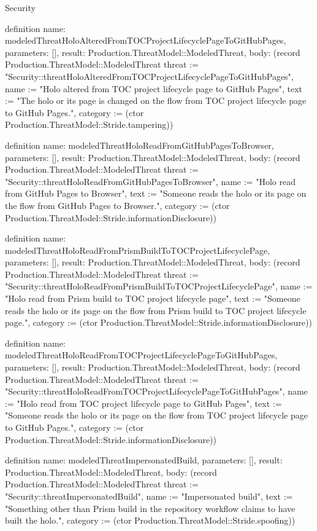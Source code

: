 \begin{lexlean}{Security}
\begin{semanticmodule}
definition{
  name: modeledThreatHoloAlteredFromTOCProjectLifecyclePageToGitHubPages,
  parameters: [],
  result: Production.ThreatModel::ModeledThreat,
  body: (record Production.ThreatModel::ModeledThreat {threat := "Security::threatHoloAlteredFromTOCProjectLifecyclePageToGitHubPages", name := "Holo altered from TOC project lifecycle page to GitHub Pages", text := "The holo or its page is changed on the flow from TOC project lifecycle page to GitHub Pages.", category := (ctor Production.ThreatModel::Stride.tampering)})
}

definition{
  name: modeledThreatHoloReadFromGitHubPagesToBrowser,
  parameters: [],
  result: Production.ThreatModel::ModeledThreat,
  body: (record Production.ThreatModel::ModeledThreat {threat := "Security::threatHoloReadFromGitHubPagesToBrowser", name := "Holo read from GitHub Pages to Browser", text := "Someone reads the holo or its page on the flow from GitHub Pages to Browser.", category := (ctor Production.ThreatModel::Stride.informationDisclosure)})
}

definition{
  name: modeledThreatHoloReadFromPrismBuildToTOCProjectLifecyclePage,
  parameters: [],
  result: Production.ThreatModel::ModeledThreat,
  body: (record Production.ThreatModel::ModeledThreat {threat := "Security::threatHoloReadFromPrismBuildToTOCProjectLifecyclePage", name := "Holo read from Prism build to TOC project lifecycle page", text := "Someone reads the holo or its page on the flow from Prism build to TOC project lifecycle page.", category := (ctor Production.ThreatModel::Stride.informationDisclosure)})
}

definition{
  name: modeledThreatHoloReadFromTOCProjectLifecyclePageToGitHubPages,
  parameters: [],
  result: Production.ThreatModel::ModeledThreat,
  body: (record Production.ThreatModel::ModeledThreat {threat := "Security::threatHoloReadFromTOCProjectLifecyclePageToGitHubPages", name := "Holo read from TOC project lifecycle page to GitHub Pages", text := "Someone reads the holo or its page on the flow from TOC project lifecycle page to GitHub Pages.", category := (ctor Production.ThreatModel::Stride.informationDisclosure)})
}

definition{
  name: modeledThreatImpersonatedBuild,
  parameters: [],
  result: Production.ThreatModel::ModeledThreat,
  body: (record Production.ThreatModel::ModeledThreat {threat := "Security::threatImpersonatedBuild", name := "Impersonated build", text := "Something other than Prism build in the repository workflow claims to have built the holo.", category := (ctor Production.ThreatModel::Stride.spoofing)})
}


\end{semanticmodule}
\end{lexlean}
